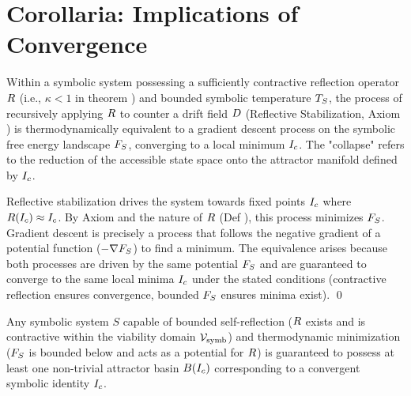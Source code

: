 \section{Corollaria: Implications of Convergence}
\label{sec:bk7_corollaria_implications_of_convergence}
\begin{corollary}
\label{corollary:bk7_drift_collapse_equivalence}
Within a symbolic system possessing a sufficiently contractive reflection operator \(R\) (i.e., \(\kappa < 1\) in theorem ) and bounded symbolic temperature \(T_S\), the process of recursively applying \(R\) to counter a drift field \(D\) (Reflective Stabilization, Axiom ) is thermodynamically equivalent to a gradient descent process on the symbolic free energy landscape \(F_S\), converging to a local minimum \(I_c\). The "collapse" refers to the reduction of the accessible state space onto the attractor manifold defined by \(I_c\).
\end{corollary}
\begin{demonstratio}
\label{demonstratio:bk7_gradient_vs_reflective_dynamics}
Reflective stabilization drives the system towards fixed points \(I_c\) where \(R(I_c) \approx I_c\). By Axiom  and the nature of \(R\) (Def ), this process minimizes \(F_S\). Gradient descent is precisely a process that follows the negative gradient of a potential function (\(-\nabla F_S\)) to find a minimum. The equivalence arises because both processes are driven by the same potential \(F_S\) and are guaranteed to converge to the same local minima \(I_c\) under the stated conditions (contractive reflection ensures convergence, bounded \(F_S\) ensures minima exist). \qed
\end{demonstratio}
\begin{corollary}
\label{corollary:bk7_recursive_convergence_principle}
Any symbolic system \(S\) capable of bounded self-reflection (\(R\) exists and is contractive within the viability domain \(\mathcal{V}_{\mathrm{symb}}\)) and thermodynamic minimization (\(F_S\) is bounded below and acts as a potential for \(R\)) is guaranteed to possess at least one non-trivial attractor basin \(B(I_c)\) corresponding to a convergent symbolic identity \(I_c\).
\end{corollary}
